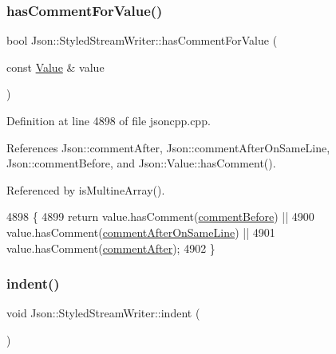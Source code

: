 \subsubsection{\texorpdfstring{has\+Comment\+For\+Value()}{hasCommentForValue()}}
{\footnotesize\ttfamily bool Json\+::\+Styled\+Stream\+Writer\+::has\+Comment\+For\+Value (\begin{DoxyParamCaption}\item[{const \hyperlink{class_json_1_1_value}{Value} \&}]{value }\end{DoxyParamCaption})\hspace{0.3cm}{\ttfamily [private]}}



Definition at line 4898 of file jsoncpp.\+cpp.



References Json\+::comment\+After, Json\+::comment\+After\+On\+Same\+Line, Json\+::comment\+Before, and Json\+::\+Value\+::has\+Comment().



Referenced by is\+Multine\+Array().


\begin{DoxyCode}
4898                                                               \{
4899   \textcolor{keywordflow}{return} value.hasComment(\hyperlink{namespace_json_a4fc417c23905b2ae9e2c47d197a45351a52f1733775460517b2ea6bedf4906d52}{commentBefore}) ||
4900          value.hasComment(\hyperlink{namespace_json_a4fc417c23905b2ae9e2c47d197a45351a008a230a0586de54f30b76afe70fdcfa}{commentAfterOnSameLine}) ||
4901          value.hasComment(\hyperlink{namespace_json_a4fc417c23905b2ae9e2c47d197a45351ac5784ca53b12250888ddb642b06aebef}{commentAfter});
4902 \}
\end{DoxyCode}
\mbox{\label{class_json_1_1_styled_stream_writer_ab49409578422aa73b060e3492dd6c72a}} 
\subsubsection{\texorpdfstring{indent()}{indent()}}
{\footnotesize\ttfamily void Json\+::\+Styled\+Stream\+Writer\+::indent (\begin{DoxyParamCaption}{ }\end{DoxyParamCaption})\hspace{0.3cm}{\ttfamily [private]}}



